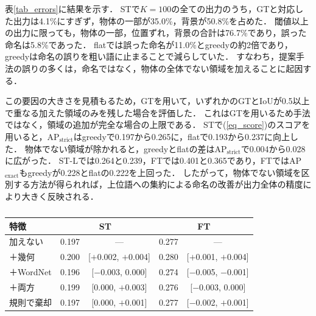 表\ref{tab_errors}に結果を示す．
STで$ K = 100 $の全ての出力のうち，GTと対応した出力は4.1\%にすぎず，物体の一部が35.0\%，背景が50.8\%を占めた．
閾値以上の出力に限っても，物体の一部，位置ずれ，背景の合計は76.7\%であり，誤った命名は5.8\%であった．
flatでは誤った命名が11.0\%とgreedyの約2倍であり，greedyは命名の誤りを粗い語に止まることで減らしていた．
すなわち，提案手法の誤りの多くは，命名ではなく，物体の全体でない領域を加えることに起因する．

この要因の大きさを見積もるため，GTを用いて，いずれかのGTとIoUが0.5以上で重なる加えた領域のみを残した場合を評価した．
これはGTを用いるため手法ではなく，領域の追加が完全な場合の上限である．
STで(\ref{eq_score})のスコアを用いると，AP$ _{\mathrm{strict}} $はgreedyで0.197から0.265に，flatで0.193から0.237に向上した．
物体でない領域が除かれると，greedyとflatの差はAP$ _{\mathrm{strict}} $で0.004から0.028に広がった．
ST-Lでは0.264と0.239，FTでは0.401と0.365であり，FTではAP$ _{\mathrm{exact}} $もgreedyが0.228とflatの0.222を上回った．
したがって，物体でない領域を区別する方法が得られれば，上位語への集約による命名の改善が出力全体の精度により大きく反映される．

\begingroup
\color{red}
\begin{table}[t]
    \vspace{3mm}
    \centering
    \caption{}
    \label{tab_whole}
    \color{red}
    \footnotesize
    \setlength{\tabcolsep}{2pt}
    \begin{tabular}{lcccc}
        \toprule
        特徴 & \multicolumn{2}{c}{ST} & \multicolumn{2}{c}{FT} \\
        \midrule
        加えない & 0.197 & --- & 0.277 & --- \\
        ＋幾何 & 0.200 & [$+$0.002, $+$0.004] & 0.280 & [$+$0.001, $+$0.004] \\
        ＋WordNet & 0.196 & [$-$0.003, 0.000] & 0.274 & [$-$0.005, $-$0.001] \\
        ＋両方 & 0.199 & [0.000, $+$0.003] & 0.276 & [$-$0.003, 0.000] \\
        規則で棄却 & 0.197 & [0.000, $+$0.001] & 0.277 & [$-$0.002, $+$0.001] \\
        \bottomrule
    \end{tabular}
\end{table}

